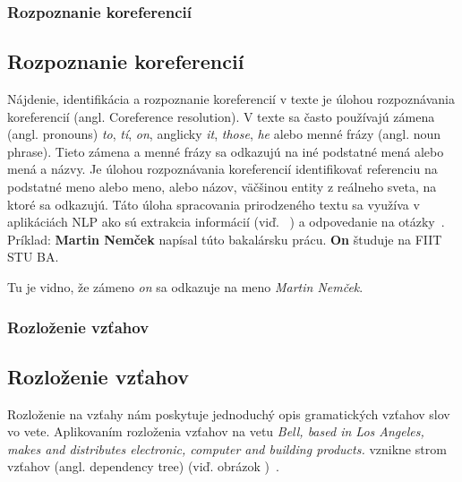 %
%
{
	\subsubsection{Rozpoznanie koreferencií}
}
{
	\subsection{Rozpoznanie koreferencií}
}
\label{subsubsec:corefparsing}
Nájdenie, identifikácia a rozpoznanie koreferencií v texte je úlohou rozpoznávania koreferencií (angl. Coreference resolution). V texte sa často používajú zámena (angl. pronouns) \textit{to}, \textit{tí}, \textit{on}, anglicky \textit{it}, \textit{those}, \textit{he} alebo menné frázy (angl. noun phrase). Tieto zámena a menné frázy sa odkazujú na iné podstatné mená alebo mená a názvy. Je úlohou rozpoznávania koreferencií identifikovať referenciu na podstatné meno alebo meno, alebo názov, väčšinou entity z reálneho sveta, na ktoré sa odkazujú. Táto úloha spracovania prirodzeného textu sa využíva v aplikáciách NLP ako sú extrakcia informácií (viď. ~) a odpovedanie na otázky~\cite{Bryl}.
\\

Príklad:
\textbf{Martin Nemček} napísal túto bakalársku prácu. \textbf{On} študuje na FIIT STU BA.

Tu je vidno, že zámeno \textit{on} sa odkazuje na meno \textit{Martin Nemček}.

%
%
{
	\subsubsection{Rozloženie vzťahov}
}
{
	\subsection{Rozloženie vzťahov}
}
\label{subsubsec:dependencyparsing}
Rozloženie na vzťahy nám poskytuje jednoduchý opis gramatických vzťahov slov vo vete. Aplikovaním rozloženia vzťahov na vetu \textit{Bell, based in Los
Angeles, makes and distributes electronic, computer and building products.
} vznikne strom vzťahov (angl. dependency tree) (viď. obrázok )~\cite{StanfordDepManual}.

